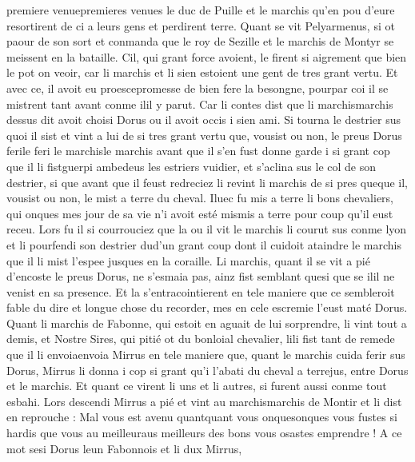 \documentclass{article}
\begin{document}
\begin{pages}
   premiere venuepremieres venues 
   le duc de Puille 
   et le marchis qu’en pou d’eure resortirent de ci a leurs gens et perdirent terre. \pend
\pstart Quant se vit Pelyarmenus, si ot paour de son sort 
   et conmanda que le roy de Sezille et 
   le marchis de Montyr se meissent en 
   la bataille. Cil, qui grant force avoient, le firent si aigrement que bien le 
   pot on veoir, car li marchis et li sien estoient une gent de 
   tres grant vertu. Et avec ce, il avoit eu 
   proescepromesse de bien fere la besongne, 
   pourpar coi il se mistrent tant avant conme 
   ilil y parut. Car li contes dist que 
   li marchismarchis dessus dit 
   avoit choisi Dorus ou il avoit occis i sien ami. Si tourna le destrier sus quoi il sist 
   et vint a lui de si tres grant vertu que, vousist ou non, le preus Dorus 
   ferile feri 
   le marchisle marchis
      avant que il s'en fust donne garde i si grant cop que il 
   li fistguerpi ambedeus 
   les estriers vuidier, 
   et s’aclina sus le col de son destrier, si que avant que il feust redreciez li revint 
   li marchis de si pres 
   queque il, 
   vousist ou non, le mist a terre du cheval. Iluec fu mis a terre li bons chevaliers, qui onques mes 
   jour de sa vie n’i avoit esté mismis a terre pour coup 
   qu’il eust receu. Lors fu il si courrouciez que la ou il vit 
   le marchis li courut sus conme lyon et li pourfendi son destrier 
   dud'un grant coup dont il cuidoit ataindre le marchis 
      que il li mist l’espee jusques en la coraille. \pend
\pstart Li marchis, quant il se vit a pié d’encoste 
   le preus Dorus, ne s’esmaia pas, 
   ainz fist semblant quesi que se 
   ilil ne venist en sa presence. 
   Et la s’entracointierent en tele maniere que ce sembleroit fable du dire et longue chose du recorder, 
   mes en cele escremie l’eust maté Dorus. Quant li marchis de 
      Fabonne, qui estoit en aguait de lui sorprendre, li vint tout a demis, et Nostre Sires, 
   qui pitié ot du bonloial chevalier, 
   lili fist tant de remede que il li 
   envoiaenvoia Mirrus en tele maniere que, quant 
   le marchis cuida ferir sus Dorus, 
   Mirrus li donna i cop si grant qu’i l’abati du cheval 
   a terrejus, entre Dorus et 
   le marchis. Et quant ce virent li uns 
   et li autres, si furent aussi conme tout esbahi. Lors descendi Mirrus a pié et vint au 
   marchismarchis de Montir 
   et li dist en reprouche :
   Mal vous est avenu quantquant vous 
      onquesonques vous fustes si hardis que vous 
      au meilleuraus meilleurs des bons vous osastes emprendre !
   A ce mot sesi Dorus 
   leun Fabonnois 
   et li dux Mirrus, 

\end{pages}
\end{document}
